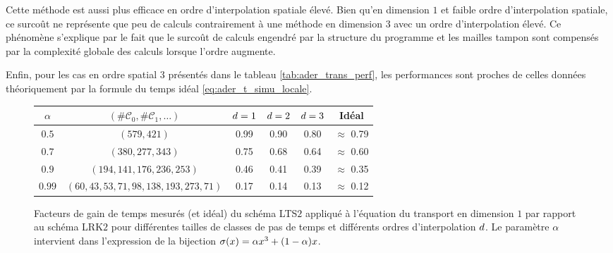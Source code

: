Cette méthode est aussi plus efficace en ordre d'interpolation spatiale élevé.
Bien qu'en dimension $1$ et faible ordre d'interpolation spatiale,
ce surcoût ne représente que peu de calculs contrairement à une méthode
en dimension $3$ avec un ordre d'interpolation élevé.
Ce phénomène s'explique par le fait que le surcoût de calculs engendré
par la structure du programme et les mailles tampon sont compensés par la
complexité globale des calculs lorsque l'ordre augmente.

Enfin, pour les cas en ordre spatial $3$ présentés dans le tableau
\ref{tab:ader_trans_perf}, les performances sont proches de celles
données théoriquement par la formule du temps idéal \eqref{eq:ader_t_simu_locale}.


\begin{figure}[!h]
	\begin{center}
		\caption{
			\label{tab:ader_trans_perf_many_classes}
			Facteurs de gain de temps mesurés (et idéal) du schéma LTS$2$
			appliqué à l'équation du transport en dimension $1$
			par rapport au schéma LRK$2$ pour différentes
			tailles de classes de pas de temps
			et différents ordres d'interpolation $d$.
			Le paramètre $\alpha$ intervient dans l'expression de la
			bijection $\sigma(x) = \alpha x^3 + (1 - \alpha) x$.
		}
		
		\begin{tabular}{|c|c|c|c|c|c|}
			\hline
			$\alpha$ & $(\#\mathcal{C}_0, \#\mathcal{C}_1, \ldots)$ & $d = 1$ & $d = 2$ & $d = 3$ & Idéal \\ \hline\hline
			$0.5$ & $(579,421)$ & 0.99 & 0.90 & 0.80 & $\approx$ 0.79 \\	\hline
			$0.7$ & $(380,277,343)$ & 0.75 & 0.68 & 0.64 & $\approx$ 0.60 \\	\hline
			$0.9$ & $(194,141,176,236,253)$ & 0.46 & 0.41 & 0.39 & $\approx$ 0.35 \\	\hline
			$0.99$ & $(60,43,53,71,98,138,193,273,71)$ & 0.17 & 0.14 & 0.13 & $\approx$ 0.12 \\	\hline
		\end{tabular}
	\end{center}
\end{figure}

